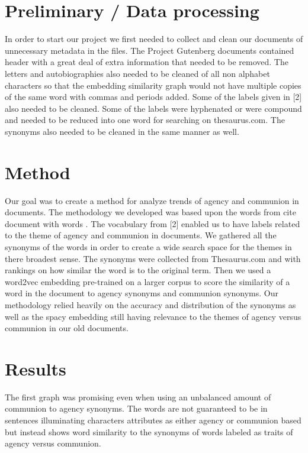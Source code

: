 \documentclass{article}
\begin{document}
\section{Preliminary / Data processing}
\label{preliminary}
In order to start our project we first needed to collect and clean our documents of unnecessary metadata in the files. The Project Gutenberg  documents contained header with a great deal of extra information that needed to be removed. The letters and autobiographies also needed to be cleaned of all non alphabet characters so that the embedding similarity graph would not have multiple copies of the same word with commas and periods added. Some of the labels given in [2] also needed to be cleaned. Some of the labels were hyphenated or were compound and needed to be reduced into one word for searching on thesaurus.com. The synonyms also needed to be cleaned in the same manner as well. 

\section{Method}
\label{method}
    Our goal was to create a method for analyze trends of agency and communion in documents. The methodology we developed was based upon the words from {cite document with words} . The vocabulary from [2] enabled us to have labels related to the theme of agency and communion in documents. We gathered all the synonyms of the words in order to create a wide search space for the themes in there broadest sense. The synonyms were collected from Thesaurus.com and with rankings on how similar the word is to the original term. Then we used a word2vec embedding pre-trained on a larger corpus to score the similarity of a word in the document to agency synonyms and communion synonyms. Our methodology relied heavily on the accuracy and distribution of the synonyms as well as the spacy embedding still having relevance to the themes of agency versus communion in our old documents. 
\section{Results}
\label{results}
    The first graph was promising even when using an unbalanced amount of communion to agency synonyms. The words are not guaranteed to be in sentences illuminating characters attributes as either agency or communion based but instead shows word similarity to the synonyms of words labeled as traits of agency versus communion. 
    
\end{document}
